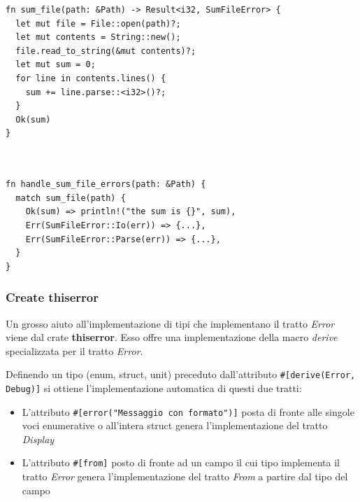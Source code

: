 \begin{center}
  \begin{minipage}{\linewidth}
    \begin{minipage}{0.49\linewidth}
      \begin{verbatim}
fn sum_file(path: &Path) -> Result<i32, SumFileError> {
  let mut file = File::open(path)?;
  let mut contents = String::new();
  file.read_to_string(&mut contents)?;
  let mut sum = 0;
  for line in contents.lines() {
    sum += line.parse::<i32>()?;
  }
  Ok(sum)
}
\end{verbatim}
    \end{minipage}%
    \hfill %
    \begin{minipage}{0.49\linewidth}

      \begin{verbatim}


fn handle_sum_file_errors(path: &Path) {
  match sum_file(path) {
    Ok(sum) => println!("the sum is {}", sum),
    Err(SumFileError::Io(err)) => {...},
    Err(SumFileError::Parse(err)) => {...},
  }
}
        \end{verbatim}


    \end{minipage}
  \end{minipage}
\end{center}

\subsubsection{Create thiserror}

Un grosso aiuto all'implementazione di tipi che implementano il tratto \textit{Error}
viene dal crate \textbf{thiserror}. Esso offre una implementazione della macro \textit{derive}
specializzata per il tratto \textit{Error}.

Definendo un tipo (enum, struct, unit) preceduto dall'attributo
\texttt{#[derive(Error, Debug)]} si ottiene l'implementazione
automatica di questi due tratti:


\begin{itemize}
  \item L'attributo \texttt{#[error("Messaggio con formato")]} posta di fronte alle singole
        voci enumerative o all'intera struct genera l'implementazione del tratto \textit{Display}
  \item L'attributo \texttt{#[from]} posto di fronte ad un campo il cui tipo implementa il
        tratto \textit{Error} genera l'implementazione del tratto \textit{From} a partire dal tipo del
        campo
\end{itemize}


